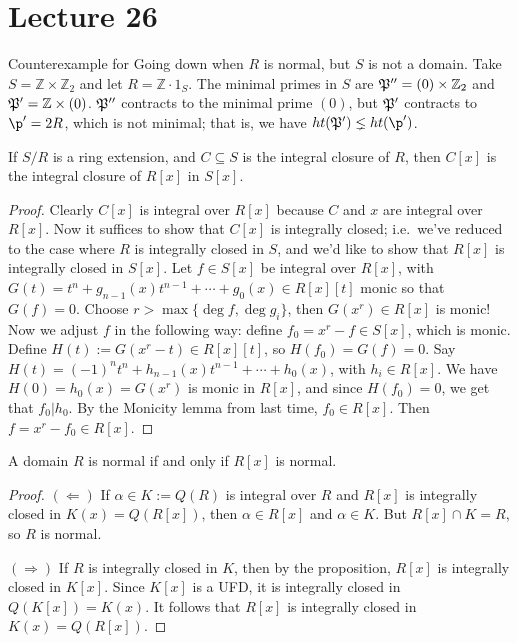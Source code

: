  \section{Lecture 26}

 \begin{example}
   Counterexample for Going down when $R$ is normal, but $S$ is not a domain. Take
   $S=\mathbb{Z}\times \mathbb{Z}_2$ and let $R=\mathbb{Z}\cdot 1_S$. The minimal primes in $S$ are
   $\P''=(0)\times \mathbb{Z}_2$ and $\P'=\mathbb{Z}\times (0)$. $\P''$ contracts to
   the minimal prime $(0)$, but $\P'$ contracts to $\p'=2R$, which is not minimal; that
   is, we have $ht(\P')\lneq ht(\p')$.
 \end{example}

 \begin{proposition}
   If $S/R$ is a ring extension, and $C\subseteq S$ is the integral closure of $R$, then
   $C[x]$ is the integral closure of $R[x]$ in $S[x]$.
 \end{proposition}
 \begin{proof}
   Clearly $C[x]$ is integral over $R[x]$ because $C$ and $x$ are integral over $R[x]$.
   Now it suffices to show that $C[x]$ is integrally closed; i.e.~we've reduced to the
   case where $R$ is integrally closed in $S$, and we'd like to show that $R[x]$ is
   integrally closed in $S[x]$. Let $f\in S[x]$ be integral over $R[x]$, with
   $G(t)=t^n+g_{n-1}(x)t^{n-1}+\cdots+g_0(x)\in R[x][t]$ monic so that $G(f)=0$. Choose
   $r> \max\{\deg f, \deg g_i\}$, then $G(x^r)\in R[x]$ is monic! Now we adjust $f$ in
   the following way: define $f_0=x^r-f\in S[x]$, which is monic. Define
   $H(t):=G(x^r-t)\in R[x][t]$, so $H(f_0)=G(f)=0$. Say $H(t)=(-1)^nt^n +
   h_{n-1}(x)t^{n-1}+\cdots+h_0(x)$, with $h_i\in R[x]$. We have $H(0)=h_0(x)=G(x^r)$ is
   monic in $R[x]$, and since $H(f_0)=0$, we get that $f_0|h_0$. By the Monicity lemma
   from last time, $f_0\in R[x]$. Then $f=x^r-f_0\in R[x]$.
 \end{proof}
 \begin{theorem}
   A domain $R$ is normal if and only if $R[x]$ is normal.
 \end{theorem}
 \begin{proof}
   $(\Leftarrow)$ If $\alpha\in K:=Q(R)$ is integral over $R$ and $R[x]$ is integrally
   closed in $K(x)=Q(R[x])$, then $\alpha\in R[x]$ and $\alpha\in K$. But $R[x]\cap K=R$,
   so $R$ is normal.

   $(\Rightarrow)$ If $R$ is integrally closed in $K$, then by the proposition, $R[x]$ is
   integrally closed in $K[x]$. Since $K[x]$ is a UFD, it is integrally closed in
   $Q(K[x])=K(x)$. It follows that $R[x]$ is integrally closed in $K(x)=Q(R[x])$.
 \end{proof}
